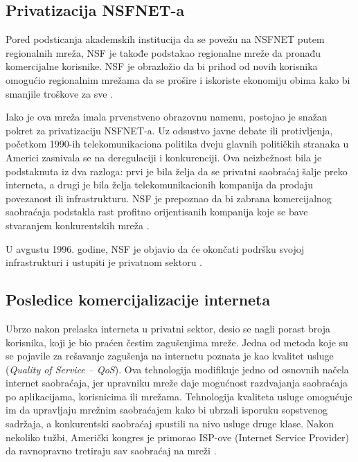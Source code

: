 \documentclass[12pt,a4paper]{article}
\begin{document}
\subsection{\textbf{Privatizacija NSFNET-a}}

Pored podsticanja akademskih institucija da se povežu na NSFNET putem regionalnih mreža, NSF je takođe podstakao regionalne mreže da pronađu komercijalne korisnike. NSF je obrazložio da bi prihod od novih korisnika omogućio regionalnim mrežama da se prošire i iskoriste ekonomiju obima kako bi smanjile troškove za sve \cite{privatization_backbone}.

Iako je ova mreža imala prvenstveno obrazovnu namenu, postojao je snažan pokret za privatizaciju NSFNET-a. Uz odsustvo javne debate ili protivljenja, početkom 1990-ih telekomunikaciona politika dveju glavnih političkih stranaka u Americi zasnivala se na deregulaciji i konkurenciji. Ova neizbežnost bila je podstaknuta iz dva razloga: prvi je bila želja da se privatni saobraćaj šalje preko interneta, a drugi je bila želja telekomunikacionih kompanija da prodaju povezanost ili infrastrukturu. NSF je prepoznao da bi zabrana komercijalnog saobraćaja podstakla rast profitno orijentisanih kompanija koje se bave stvaranjem konkurentskih mreža \cite{privatization_backbone}.

U avgustu 1996. godine, NSF je objavio da će okončati podršku svojoj infrastrukturi i ustupiti je privatnom sektoru \cite{privatization_backbone}.

\newpage

\subsection{\textbf{Posledice komercijalizacije interneta}}

Ubrzo nakon prelaska interneta u privatni sektor, desio se nagli porast broja korisnika, koji je bio praćen čestim zagušenjima mreže. Jedna od metoda koje su se pojavile za rešavanje zagušenja na internetu poznata je kao kvalitet usluge (\textit{Quality of Service – QoS}). Ova tehnologija modifikuje jedno od osnovnih načela internet saobraćaja, jer upravniku mreže daje mogućnost razdvajanja saobraćaja po aplikacijama, korisnicima ili mrežama. Tehnologija kvaliteta usluge omogućuje im da upravljaju mrežnim saobraćajem kako bi ubrzali isporuku sopstvenog sadržaja, a konkurentski saobraćaj spustili na nivo usluge druge klase. Nakon nekoliko tužbi, Američki kongres je primorao ISP-ove (Internet Service Provider) da ravnopravno tretiraju sav saobraćaj na mreži \cite{privatization_backbone}.
\end{document}
